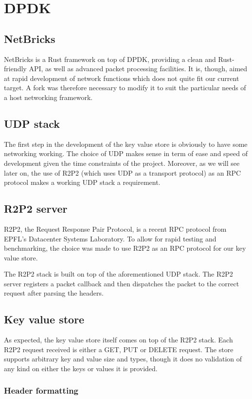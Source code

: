 \documentclass[11pt]{article}
\begin{document}
\section{DPDK}
\subsection{NetBricks}
NetBricks is a Rust framework on top of DPDK, providing a clean and
Rust-friendly API, as well as advanced packet processing facilities.
It is, though, aimed at rapid development of network functions which
does not quite fit our current target. A fork was therefore necessary
to modify it to suit the particular needs of a host networking
framework.

\subsection{UDP stack}
The first step in the development of the key value store is obviously
to have some networking working. The choice of UDP makes sense in term
of ease and speed of development given the time constraints of the
project. Moreover, as we will see later on, the use of R2P2 (which
uses UDP as a transport protocol) as an RPC protocol makes a
working UDP stack a requirement.

\subsection{R2P2 server}
R2P2, the Request Response Pair Protocol, is a recent RPC protocol
from EPFL's Datacenter Systems Laboratory. To allow for rapid testing
and benchmarking, the choice was made to use R2P2 as an RPC protocol
for our key value store.

The R2P2 stack is built on top of the aforementioned UDP stack. The
R2P2 server registers a packet callback and then dispatches the packet
to the correct request after parsing the headers.

\subsection{Key value store}

As expected, the key value store itself comes on top of the R2P2
stack. Each R2P2 request received is either a GET, PUT or DELETE
request. The store supports arbitrary key and value size and types,
though it does no validation of any kind on either the keys or values
it is provided.

\subsubsection{Header formatting}
\end{document}
